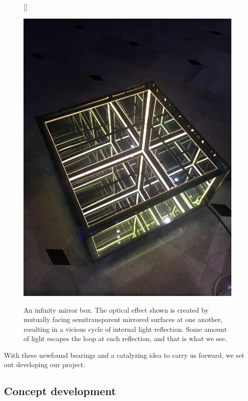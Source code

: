 \documentclass[12pt]{article}
\begin{document}
    \begin{figure}[h]
        [\FBwidth]
        {\caption{An infinity mirror box. The optical effect shown is created by mutually facing semitransparent mirrored surfaces at one another, resulting in a vicious cycle of internal light reflection. Some amount of light escapes the loop at each reflection, and that is what we see.}\label{fig:infinity mirror}}
        {\includegraphics[width=\linewidth]{images/mirrorbox.png}}
    \end{figure}

    With these newfound bearings and a catalyzing idea to carry us forward, we set out developing our project.
    
    \pagebreak
    \subsection{Concept development}
\end{document}
